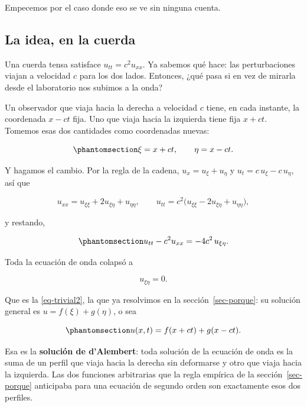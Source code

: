 \documentclass[
  spanish,
  a4paper,
]{scrbook}
\theoremstyle{definition}
\theoremstyle{plain}
\theoremstyle{definition}
\theoremstyle{plain}
\theoremstyle{definition}
\theoremstyle{remark}
\begin{document}
Empecemos por el caso donde eso se ve sin ninguna cuenta.

\subsection{La idea, en la cuerda}\label{sec-idea-canonica}

Una cuerda tensa satisface \(u_{tt} = c^2u_{xx}\). Ya sabemos qué hace:
las perturbaciones viajan a velocidad \(c\) para los dos lados.
Entonces, ¿qué pasa si en vez de mirarla desde el laboratorio nos
subimos a la onda?

Un observador que viaja hacia la derecha a velocidad \(c\) tiene, en
cada instante, la coordenada \(x - ct\) fija. Uno que viaja hacia la
izquierda tiene fija \(x + ct\). Tomemos esas dos cantidades como
coordenadas nuevas:

\begin{equation}\protect\phantomsection\label{eq-coord-onda}{
\xi = x + ct, \qquad \eta = x - ct .
}\end{equation}

Y hagamos el cambio. Por la regla de la cadena, \(u_x = u_\xi + u_\eta\)
y \(u_t = c\,u_\xi - c\,u_\eta\), así que

\[
u_{xx} = u_{\xi\xi} + 2u_{\xi\eta} + u_{\eta\eta}, \qquad
u_{tt} = c^2\big(u_{\xi\xi} - 2u_{\xi\eta} + u_{\eta\eta}\big),
\]

y restando,

\begin{equation}\protect\phantomsection\label{eq-onda-canonica}{
u_{tt} - c^2u_{xx} = -4c^2\,u_{\xi\eta} .
}\end{equation}

Toda la ecuación de onda colapsó a

\[
u_{\xi\eta} = 0 .
\]

Que es la \ref{eq-trivial2}, la que ya resolvimos en la
sección~\ref{sec-porque}: su solución general es
\(u = f(\xi) + g(\eta)\), o sea

\begin{equation}\protect\phantomsection\label{eq-dalembert}{
u(x,t) = f(x+ct) + g(x-ct) .
}\end{equation}

Esa es la \textbf{solución de d'Alembert}: toda solución de la ecuación
de onda es la suma de un perfil que viaja hacia la derecha sin
deformarse y otro que viaja hacia la izquierda. Las dos funciones
arbitrarias que la regla empírica de la sección~\ref{sec-porque}
anticipaba para una ecuación de segundo orden son exactamente esos dos
perfiles.
\end{document}
